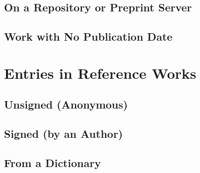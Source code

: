 \documentclass{article}
\begin{document}
\subsection{On a Repository or Preprint Server} %
\label{sub:on_a_repository_or_preprint_server}
\begin{refsection}
	\printbibliography[heading=none]
\end{refsection}
\subsection{Work with No Publication Date} %
\label{sub:work_with_no_publication_date}
\begin{refsection}
	\printbibliography[heading=none]
\end{refsection}

\section{Entries in Reference Works} %
\label{sec:entries_in_reference_works}
\subsection{Unsigned (Anonymous)} %
\label{sub:unsigned_anonymous}
\begin{refsection}
	\printbibliography[heading=none]
\end{refsection}
\subsection{Signed (by an Author)} %
\label{sub:signed_by_an_author}
\begin{refsection}
	\printbibliography[heading=none]
\end{refsection}
\subsection{From a Dictionary} %
\label{sub:from_a_dictionary}
\begin{refsection}
	\printbibliography[heading=none]
\end{refsection}
\end{document}
